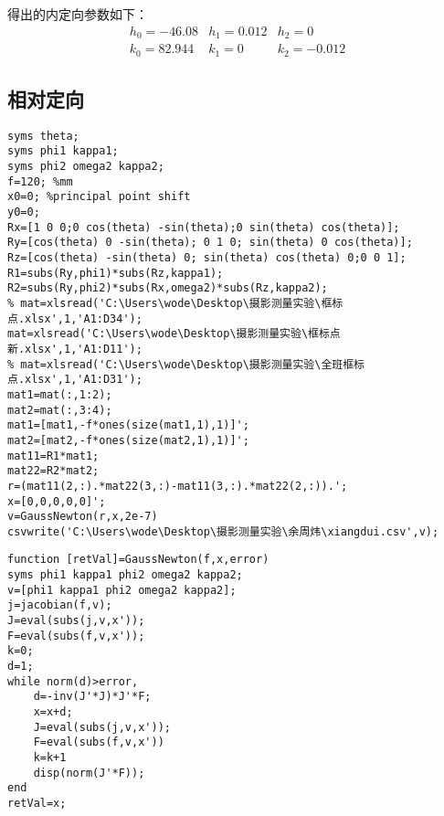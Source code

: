 得出的内定向参数如下：
\begin{equation}
\begin{array}{lll}
h_0=-46.08 & h_1=0.012 & h_2=0 \\
k_0=82.944 & k_1=0 & k_2=-0.012
\end{array}
\end{equation}

\subsection{相对定向}

\begin{lstlisting}[caption=xiangdui.m文件]
syms theta;
syms phi1 kappa1;
syms phi2 omega2 kappa2;
f=120; %mm
x0=0; %principal point shift
y0=0;
Rx=[1 0 0;0 cos(theta) -sin(theta);0 sin(theta) cos(theta)];
Ry=[cos(theta) 0 -sin(theta); 0 1 0; sin(theta) 0 cos(theta)];
Rz=[cos(theta) -sin(theta) 0; sin(theta) cos(theta) 0;0 0 1];
R1=subs(Ry,phi1)*subs(Rz,kappa1);
R2=subs(Ry,phi2)*subs(Rx,omega2)*subs(Rz,kappa2);
% mat=xlsread('C:\Users\wode\Desktop\摄影测量实验\框标点.xlsx',1,'A1:D34');
mat=xlsread('C:\Users\wode\Desktop\摄影测量实验\框标点新.xlsx',1,'A1:D11');
% mat=xlsread('C:\Users\wode\Desktop\摄影测量实验\全班框标点.xlsx',1,'A1:D31');
mat1=mat(:,1:2);
mat2=mat(:,3:4);
mat1=[mat1,-f*ones(size(mat1,1),1)]';
mat2=[mat2,-f*ones(size(mat2,1),1)]';
mat11=R1*mat1;
mat22=R2*mat2;
r=(mat11(2,:).*mat22(3,:)-mat11(3,:).*mat22(2,:)).';
x=[0,0,0,0,0]';
v=GaussNewton(r,x,2e-7)
csvwrite('C:\Users\wode\Desktop\摄影测量实验\余周炜\xiangdui.csv',v);
\end{lstlisting}


\begin{lstlisting}[caption=GaussNewton.m文件]
function [retVal]=GaussNewton(f,x,error)
syms phi1 kappa1 phi2 omega2 kappa2;
v=[phi1 kappa1 phi2 omega2 kappa2];
j=jacobian(f,v);
J=eval(subs(j,v,x'));
F=eval(subs(f,v,x'));
k=0;
d=1;
while norm(d)>error,
    d=-inv(J'*J)*J'*F;
    x=x+d;
    J=eval(subs(j,v,x'));
    F=eval(subs(f,v,x'))
    k=k+1
    disp(norm(J'*F));
end
retVal=x;
\end{lstlisting}

